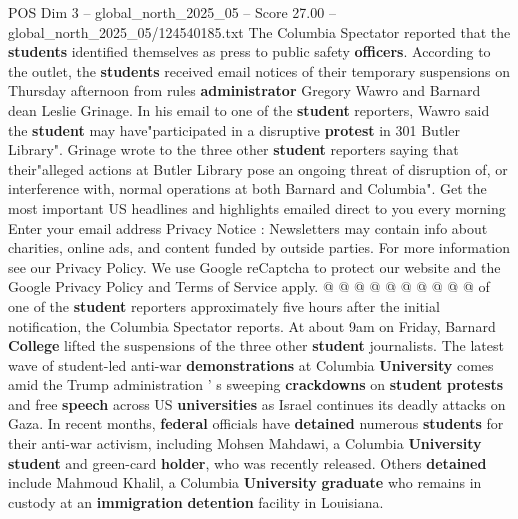\begin{textsample}{POS Dim 3 – global\_north\_2025\_05 – Score 27.00 – global\_north\_2025\_05/124540185.txt}
The Columbia Spectator reported that the \textbf{students} identified themselves as press to public safety \textbf{officers}.
According to the outlet, the \textbf{students} received email notices of their temporary suspensions on Thursday afternoon from rules \textbf{administrator} Gregory Wawro and Barnard dean Leslie Grinage.
In his email to one of the \textbf{student} reporters, Wawro said the \textbf{student} may have"participated in a disruptive \textbf{protest} in 301 Butler Library".
Grinage wrote to the three other \textbf{student} reporters saying that their"alleged actions at Butler Library pose an ongoing threat of disruption of, or interference with, normal operations at both Barnard and Columbia".
Get the most important US headlines and highlights emailed direct to you every morning Enter your email address Privacy Notice : Newsletters may contain info about charities, online ads, and content funded by outside parties.
For more information see our Privacy Policy.
We use Google reCaptcha to protect our website and the Google Privacy Policy and Terms of Service apply. @ @ @ @ @ @ @ @ @ @ of one of the \textbf{student} reporters approximately five hours after the initial notification, the Columbia Spectator reports.
At about 9am on Friday, Barnard \textbf{College} lifted the suspensions of the three other \textbf{student} journalists.
The latest wave of student-led anti-war \textbf{demonstrations} at Columbia \textbf{University} comes amid the Trump administration ' s sweeping \textbf{crackdowns} on \textbf{student} \textbf{protests} and free \textbf{speech} across US \textbf{universities} as Israel continues its deadly attacks on Gaza.
In recent months, \textbf{federal} officials have \textbf{detained} numerous \textbf{students} for their anti-war activism, including Mohsen Mahdawi, a Columbia \textbf{University} \textbf{student} and green-card \textbf{holder}, who was recently released.
Others \textbf{detained} include Mahmoud Khalil, a Columbia \textbf{University} \textbf{graduate} who remains in custody at an \textbf{immigration} \textbf{detention} facility in Louisiana.

\end{textsample}
